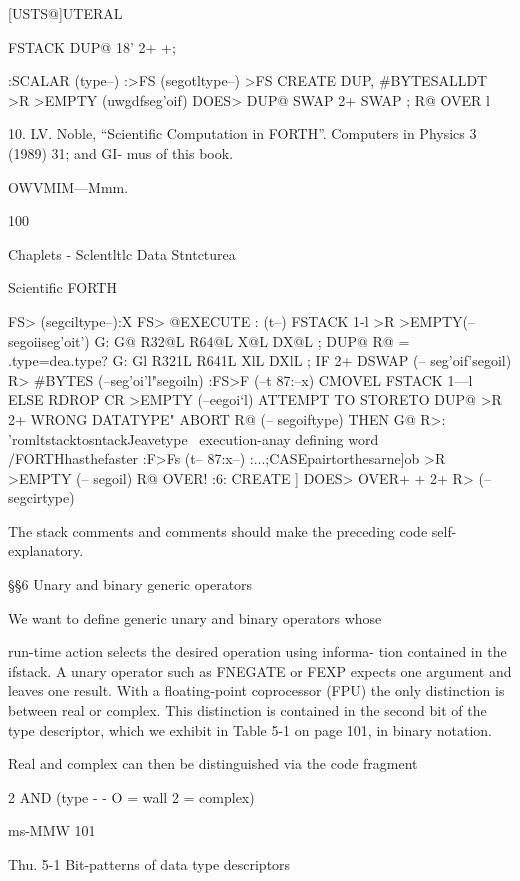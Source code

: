 [USTS@]UTERAL

\ddlnesodarandscalars FSTACK DUP@ 18' 2+ +;

:SCALAR (type--) :>FS (segotltype--) \myzx >FS
CREATE DUP, #BYTESALLDT >R >EMPTY (uwgdfseg'oif)
DOES> DUP@ SWAP 2+ SWAP ; R@ OVER l \storetypeonlstack

 

 

10. LV. Noble, “Scientific Computation in FORTH”. Computers in Physics 3 (1989) 31; and
GI- mus of this book.

OWVMIM—Mmm.

100

Chaplets - Sclentltlc Data Stntcturea

Scientific FORTH

FS> (segciltype--)\aay:X FS> @EXECUTE : (t--)
FSTACK 1-l \decllstackptr
>R >EMPTY(-- segoiiseg'oit') G: G@ R32@L R64@L X@L DX@L ;
DUP@ R@ = \srce.type=dea.type? G: Gl R321L R641L XlL DXlL ;
IF 2+ DSWAP (-- seg'oif'segoil) \movedatatromliatacktoflromFPU
R> #BYTES (--seg'oi'l"segoiln) :FS>F (--t 87:--x)
CMOVEL \movedatairomltstack FSTACK 1—l \declatackptr
ELSE RDROP CR >EMPTY (--eegoi‘l)
ATTEMPT TO STORETO DUP@ >R 2+
WRONG DATATYPE" ABORT R@ (-- segoiftype)
THEN G@ R>:
\movedatal'romltstacktosntackJeavetype
\ execution-anay defining word
\HS/FORTHhasthefaster :F>Fs (t-- 87:x--)
\CASE:...;CASEpairtorthesarne]ob >R >EMPTY (-- segoil)
R@ OVER!
:6: CREATE ] DOES> OVER+ + 2+ R> (--segcirtype)

 

The stack comments and comments should make the preceding
code self-explanatory.

§§6 Unary and binary generic operators

We want to define generic unary and binary operators whose

run-time action selects the desired operation using informa-
tion contained in the ifstack. A unary operator such as FNEGATE
or FEXP expects one argument and leaves one result. With a
floating-point coprocessor (FPU) the only distinction is between
real or complex. This distinction is contained in the second bit of
the type descriptor, which we exhibit in Table 5-1 on page 101,
in binary notation.

Real and complex can then be distinguished via the code fragment

2 AND (type - - O = wall 2 = complex)

ms-MMW 101

Thu. 5-1 Bit-patterns of data type descriptors

